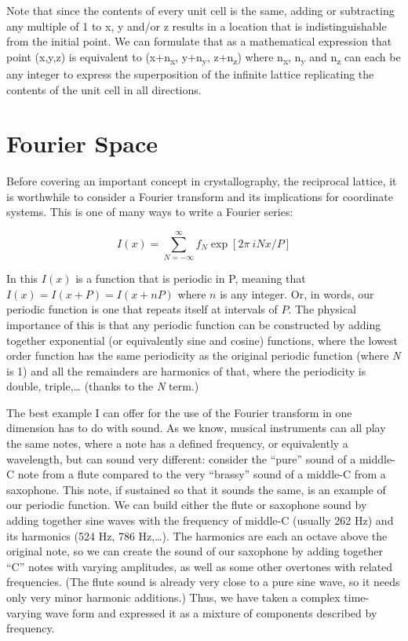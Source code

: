  Note that since the contents of every unit cell is the same, adding or subtracting any multiple of 1 to x, y and/or z results in a location that is indistinguishable from the initial point. We can formulate that as a mathematical expression that point (x,y,z) is equivalent to (x+n\textsubscript{x}, y+n\textsubscript{y}, z+n\textsubscript{z}) where n\textsubscript{x}, n\textsubscript{y} and n\textsubscript{z} can each be any integer to express the superposition of the infinite lattice replicating the contents of the unit cell in all directions. 

\section{Fourier Space}

 Before covering an important concept in crystallography, the reciprocal lattice, it is worthwhile to consider a Fourier transform and its implications for coordinate systems. This is one of many ways to write a Fourier series:

$${I(x)}=\sum_{N=-\infty}^{\infty}f_N\exp⁡[2\pi\ iNx/P]$$

In this $I(x)$ is a function that is periodic in P, meaning that $I(x) = I(x+P) = I(x+nP)$ where $n$ is any integer. Or, in words, our periodic function is one that repeats itself at intervals of $P$. The physical importance of this is that any periodic function can be constructed by adding together exponential (or equivalently sine and cosine) functions, where the lowest order function has the same periodicity as the original periodic function (where \textit{N} is 1) and all the remainders are harmonics of that, where the periodicity is double, triple,… (thanks to the \textit{N} term.) 

The best example I can offer for the use of the Fourier transform in one dimension has to do with sound. As we know, musical instruments can all play the same notes, where a note has a defined frequency, or equivalently a wavelength, but can sound very different: consider the ``pure'' sound of a middle-C note from a flute compared to the very ``brassy'' sound of a middle-C from a saxophone. This note, if sustained so that it sounds the same, is an example of our periodic function. We can build either the flute or saxophone sound by adding together sine waves with the frequency of middle-C (usually 262 Hz) and its harmonics (524 Hz, 786 Hz,…). The harmonics are each an octave above the original note, so we can create the sound of our saxophone by adding together ``C'' notes with varying amplitudes, as well as some other overtones with related frequencies. (The flute sound is already very close to a pure sine wave, so it needs only very minor harmonic additions.) 
Thus, we have taken a complex time-varying wave form and expressed it as a mixture of components described by frequency. 

